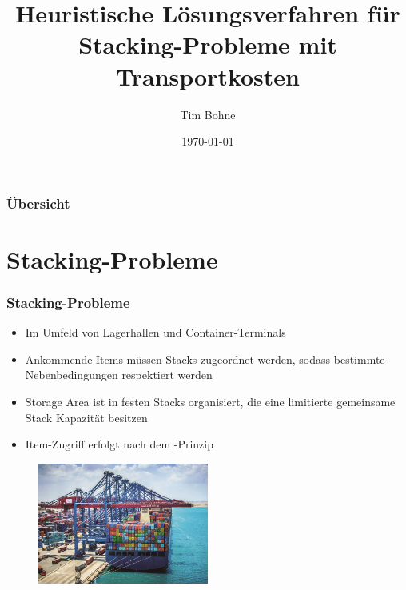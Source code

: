 \documentclass{beamer}
\title[]{Heuristische Lösungsverfahren für Stacking-Probleme mit Transportkosten}
\author{Tim Bohne}
\institute[]
{
\textit{AG Kombinatorische Optimierung}
\medskip
}
\date{\today}
\begin{document}
\begin{frame}[plain] %
\titlepage %
\end{frame}

\begin{frame}
\frametitle{Übersicht} %
\tableofcontents
\end{frame}

\section{Stacking-Probleme}

\begin{frame}
\frametitle{Stacking-Probleme}
\begin{itemize}
\item Im Umfeld von Lagerhallen und Container-Terminals
\item Ankommende Items müssen Stacks zugeordnet werden, sodass bestimmte Nebenbedingungen respektiert werden
\item Storage Area ist in festen Stacks organisiert, die eine limitierte gemeinsame Stack Kapazität besitzen
\item Item-Zugriff erfolgt nach dem -Prinzip
\end{itemize}
\begin{figure}
\centering
\includegraphics[width=0.5\textwidth]{images/container_terminal.png}
\end{figure}

\end{frame}
\end{document}
